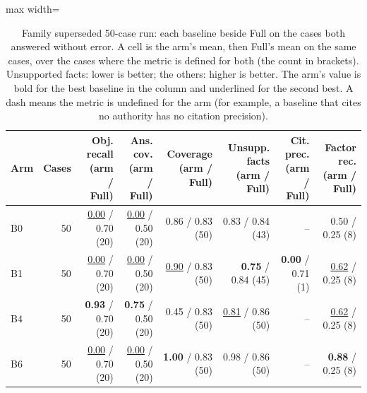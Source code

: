 \begin{table}[t]
\centering\footnotesize
\begin{adjustbox}{max width=\textwidth}
\begin{tabular}{@{}lrrrrrrr@{}}
\toprule
Arm & Cases & Obj. recall (arm / Full) & Ans. cov. (arm / Full) & Coverage (arm / Full) & Unsupp. facts (arm / Full) & Cit. prec. (arm / Full) & Factor rec. (arm / Full) \\
\midrule
B0 & 50 & \underline{0.00} / 0.70 (20) & \underline{0.00} / 0.50 (20) & 0.86 / 0.83 (50) & 0.83 / 0.84 (43) & -- & 0.50 / 0.25 (8) \\
B1 & 50 & \underline{0.00} / 0.70 (20) & \underline{0.00} / 0.50 (20) & \underline{0.90} / 0.83 (50) & \textbf{0.75} / 0.84 (45) & \textbf{0.00} / 0.71 (1) & \underline{0.62} / 0.25 (8) \\
B4 & 50 & \textbf{0.93} / 0.70 (20) & \textbf{0.75} / 0.50 (20) & 0.45 / 0.83 (50) & \underline{0.81} / 0.86 (50) & -- & \underline{0.62} / 0.25 (8) \\
B6 & 50 & \underline{0.00} / 0.70 (20) & \underline{0.00} / 0.50 (20) & \textbf{1.00} / 0.83 (50) & 0.98 / 0.86 (50) & -- & \textbf{0.88} / 0.25 (8) \\
\bottomrule
\end{tabular}
\end{adjustbox}
\caption{Family superseded 50-case run: each baseline beside Full on the cases both answered without error. A cell is the arm's mean, then Full's mean on the same cases, over the cases where the metric is defined for both (the count in brackets). Unsupported facts: lower is better; the others: higher is better. The arm's value is bold for the best baseline in the column and underlined for the second best. A dash means the metric is undefined for the arm (for example, a baseline that cites no authority has no citation precision).}
\label{tab:main_v1}
\end{table}